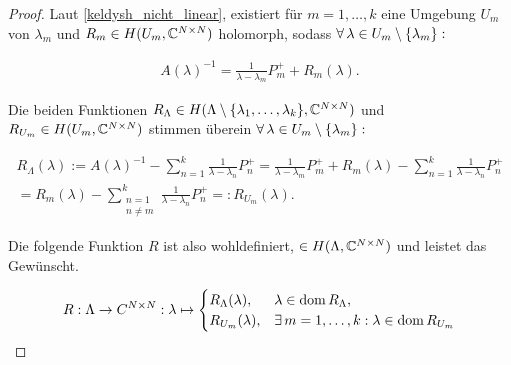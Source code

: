 \begin{proof}

    Laut \ref{keldysh_nicht_linear}, existiert für $m = 1, \dots, k$ eine Umgebung $U_m$ von $\lambda_m$ und $R_m \in H(U_m, \mathbb{C}^{N \times N})$ holomorph, sodass $\forall \, \lambda \in U_m \setminus {\left \{ \lambda_m \right \}}:$

    \begin{align*}
        A(\lambda)^{-1}
        =
        \frac{1}{\lambda - \lambda_m} P_m^+
        +
        R_m(\lambda).
    \end{align*}

    Die beiden Funktionen $R_\Lambda \in H(\Lambda \setminus {\left \{ \lambda_1, \dots, \lambda_k \right \}}, \mathbb{C}^{N \times N})$ und $R_{U_m} \in H(U_m, \mathbb{C}^{N \times N})$ stimmen überein $\forall \, \lambda \in U_m \setminus {\left \{ \lambda_m \right \}}:$

    \begin{multline*}
        R_\Lambda(\lambda)
        :=
        A(\lambda)^{-1}
        -
        \sum_{n=1}^k
            \frac{1}{\lambda - \lambda_n} P_n^+
        =
        \frac{1}{\lambda - \lambda_m} P_m^+
        +
        R_m(\lambda)
        -
        \sum_{n=1}^k
            \frac{1}{\lambda - \lambda_n} P_n^+ \\
        =
        R_m(\lambda)
        -
        \sum_{\substack{n = 1 \\ n \neq m}}^k
            \frac{1}{\lambda - \lambda_n} P_n^+
        =:
        R_{U_m}(\lambda).
    \end{multline*}

    Die folgende Funktion $R$ ist also wohldefiniert, $\in H(\Lambda, \mathbb{C}^{N \times N})$ und leistet das Gewünscht.

    \begin{align*}
        R:
        \Lambda \to C^{N \times N}:
        \lambda
        \mapsto
        \begin{cases}
            R_\Lambda(\lambda), & \lambda \in \operatorname{dom} R_\Lambda, \\
            R_{U_m}(\lambda),   & \exists \, m = 1, \dots, k: \lambda \in \operatorname{dom} R_{U_m}
        \end{cases}
    \end{align*}

\end{proof}
